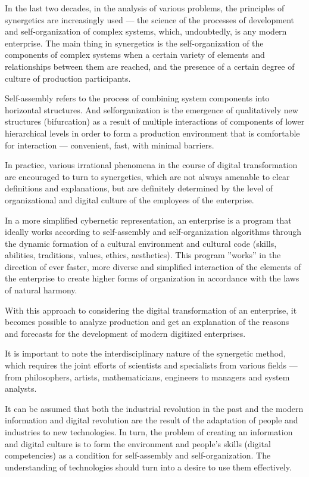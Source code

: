 \documentclass{article}
\begin{document}
\begin{multicols}{2}
In the last two decades, in the analysis of various
problems, the principles of synergetics are increasingly
used — the science of the processes of development
and self-organization of complex systems, which, undoubtedly, is any modern enterprise. The main thing in
synergetics is the self-organization of the components of
complex systems when a certain variety of elements and
relationships between them are reached, and the presence
of a certain degree of culture of production participants.

Self-assembly refers to the process of combining system components into horizontal structures. And selforganization is the emergence of qualitatively new structures (bifurcation) as a result of multiple interactions
of components of lower hierarchical levels in order to
form a production environment that is comfortable for
interaction — convenient, fast, with minimal barriers.

In practice, various irrational phenomena in the course
of digital transformation are encouraged to turn to synergetics, which are not always amenable to clear definitions and explanations, but are definitely determined
by the level of organizational and digital culture of the
employees of the enterprise.

In a more simplified cybernetic representation, an
enterprise is a program that ideally works according to
self-assembly and self-organization algorithms through
the dynamic formation of a cultural environment and
cultural code (skills, abilities, traditions, values, ethics,
aesthetics). This program ”works” in the direction of
ever faster, more diverse and simplified interaction of
the elements of the enterprise to create higher forms
of organization in accordance with the laws of natural
harmony.

With this approach to considering the digital transformation of an enterprise, it becomes possible to analyze
production and get an explanation of the reasons and
forecasts for the development of modern digitized enterprises.

It is important to note the interdisciplinary nature of
the synergetic method, which requires the joint efforts
of scientists and specialists from various fields — from
philosophers, artists, mathematicians, engineers to managers and system analysts.

It can be assumed that both the industrial revolution
in the past and the modern information and digital
revolution are the result of the adaptation of people and
industries to new technologies. In turn, the problem of
creating an information and digital culture is to form the
environment and people’s skills (digital competencies) as
a condition for self-assembly and self-organization. The
understanding of technologies should turn into a desire
to use them effectively.


\end{multicols}
\end{document}

